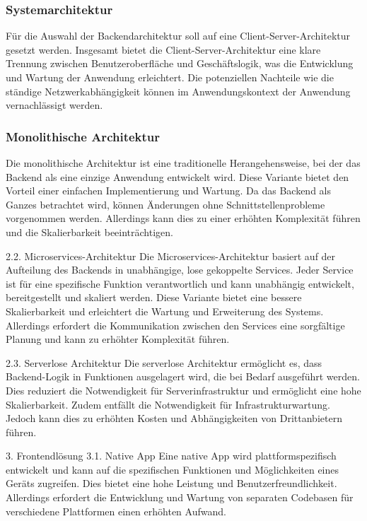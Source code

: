\subsubsection{Systemarchitektur}
\label{sec:Systemarchitektur}
Für die Auswahl der Backendarchitektur soll auf eine Client-Server-Architektur gesetzt werden. Insgesamt bietet die Client-Server-Architektur eine klare Trennung zwischen Benutzeroberfläche und Geschäftslogik, was die Entwicklung und Wartung der Anwendung erleichtert. Die potenziellen Nachteile wie die ständige Netzwerkabhängigkeit können im Anwendungskontext der Anwendung vernachlässigt werden. 

\subsubsection{Monolithische Architektur}
\label{sec:Monolithische Architektur} 
Die monolithische Architektur ist eine traditionelle Herangehensweise, bei der das Backend als eine einzige Anwendung entwickelt wird. Diese Variante bietet den Vorteil einer einfachen Implementierung und Wartung. Da das Backend als Ganzes betrachtet wird, können Änderungen ohne Schnittstellenprobleme vorgenommen werden. Allerdings kann dies zu einer erhöhten Komplexität führen und die Skalierbarkeit beeinträchtigen.

2.2. Microservices-Architektur
Die Microservices-Architektur basiert auf der Aufteilung des Backends in unabhängige, lose gekoppelte Services. Jeder Service ist für eine spezifische Funktion verantwortlich und kann unabhängig entwickelt, bereitgestellt und skaliert werden. Diese Variante bietet eine bessere Skalierbarkeit und erleichtert die Wartung und Erweiterung des Systems. Allerdings erfordert die Kommunikation zwischen den Services eine sorgfältige Planung und kann zu erhöhter Komplexität führen.

2.3. Serverlose Architektur
Die serverlose Architektur ermöglicht es, dass Backend-Logik in Funktionen ausgelagert wird, die bei Bedarf ausgeführt werden. Dies reduziert die Notwendigkeit für Serverinfrastruktur und ermöglicht eine hohe Skalierbarkeit. Zudem entfällt die Notwendigkeit für Infrastrukturwartung. Jedoch kann dies zu erhöhten Kosten und Abhängigkeiten von Drittanbietern führen.

3. Frontendlösung
3.1. Native App
Eine native App wird plattformspezifisch entwickelt und kann auf die spezifischen Funktionen und Möglichkeiten eines Geräts zugreifen. Dies bietet eine hohe Leistung und Benutzerfreundlichkeit. Allerdings erfordert die Entwicklung und Wartung von separaten Codebasen für verschiedene Plattformen einen erhöhten Aufwand.

